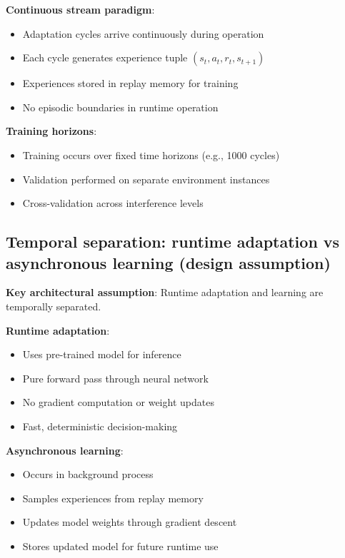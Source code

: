 \documentclass[11pt,a4paper]{article}
\begin{document}
\textbf{Continuous stream paradigm}:
\begin{itemize}
    \item Adaptation cycles arrive continuously during operation
    \item Each cycle generates experience tuple $(s_t, a_t, r_t, s_{t+1})$
    \item Experiences stored in replay memory for training
    \item No episodic boundaries in runtime operation
\end{itemize}

\textbf{Training horizons}:
\begin{itemize}
    \item Training occurs over fixed time horizons (e.g., 1000 cycles)
    \item Validation performed on separate environment instances
    \item Cross-validation across interference levels
\end{itemize}

\subsection{Temporal separation: runtime adaptation vs asynchronous learning (design assumption)}

\textbf{Key architectural assumption}: Runtime adaptation and learning are temporally separated.

\textbf{Runtime adaptation}:
\begin{itemize}
    \item Uses pre-trained model for inference
    \item Pure forward pass through neural network
    \item No gradient computation or weight updates
    \item Fast, deterministic decision-making
\end{itemize}

\textbf{Asynchronous learning}:
\begin{itemize}
    \item Occurs in background process
    \item Samples experiences from replay memory
    \item Updates model weights through gradient descent
    \item Stores updated model for future runtime use
\end{itemize}
\end{document}
